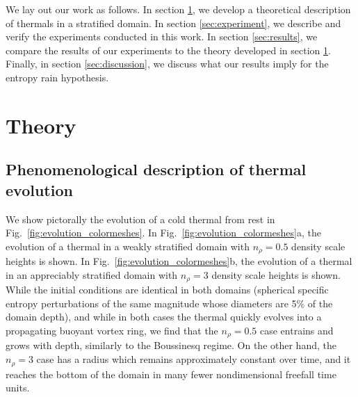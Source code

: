 \documentclass[twocolumn, amsmath, amsfonts, amssymb, trackchanges]{aastex62}
\begin{document}
We lay out our work as follows. In section \ref{sec:theory}, we develop a theoretical description
of thermals in a stratified domain. In section \ref{sec:experiment}, we describe and verify
the experiments conducted in this work. In section \ref{sec:results}, we compare the results
of our experiments to the theory developed in section \ref{sec:theory}. Finally, in section
\ref{sec:discussion}, we discuss what our results imply for the entropy rain hypothesis.

\section{Theory}
\label{sec:theory}

\subsection{Phenomenological description of thermal evolution}
We show pictorally the evolution of a cold thermal from rest in 
Fig.~\ref{fig:evolution_colormeshes}. In Fig.~\ref{fig:evolution_colormeshes}a,
the evolution of a thermal in a weakly stratified domain with
$n_\rho = 0.5$ density scale heights is shown. In Fig.~\ref{fig:evolution_colormeshes}b,
the evolution of a thermal in an appreciably stratified domain with
$n_\rho = 3$ density scale heights is shown. While the initial conditions are
identical in both domains (spherical specific entropy perturbations of the
same magnitude whose diameters are 5\% of the domain depth), and while in both cases
the thermal quickly evolves into a propagating buoyant vortex ring, we find that the
$n_\rho = 0.5$ case entrains and grows with depth, similarly to the Boussinesq regime.
On the other hand, the $n_\rho = 3$ case has a radius which remains approximately constant
over time, and it reaches the bottom of the domain in many fewer nondimensional freefall
time units.
\end{document}
